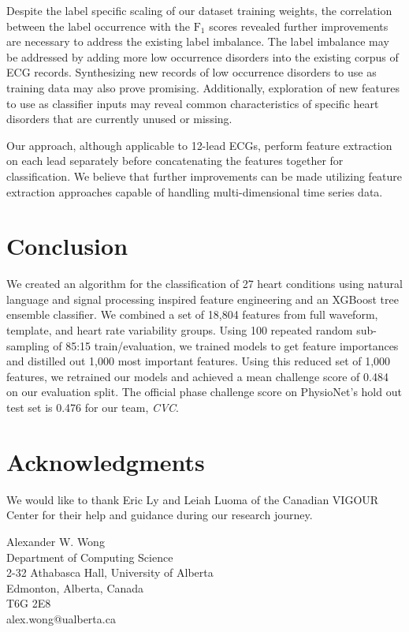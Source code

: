 \documentclass[twocolumn]{cinc}
\begin{document}
Despite the label specific scaling of our dataset training weights, the correlation between the label occurrence with the $\text{F}_1$ scores revealed further improvements are necessary to address the existing label imbalance.
The label imbalance may be addressed by adding more low occurrence disorders into the existing corpus of ECG records.
Synthesizing new records of low occurrence disorders to use as training data may also prove promising.
Additionally, exploration of new features to use as classifier inputs may reveal common characteristics of specific heart disorders that are currently unused or missing.

Our approach, although applicable to 12-lead ECGs, perform feature extraction on each lead separately before concatenating the features together for classification.
We believe that further improvements can be made utilizing feature extraction approaches capable of handling multi-dimensional time series data.

\section{Conclusion}

We created an algorithm for the classification of 27 heart conditions using natural language and signal processing inspired feature engineering and an XGBoost tree ensemble classifier.
We combined a set of 18,804 features from full waveform, template, and heart rate variability groups.
Using 100 repeated random sub-sampling of 85:15 train/evaluation, we trained models to get feature importances and distilled out 1,000 most important features.
Using this reduced set of 1,000 features, we retrained our models and achieved a mean challenge score of 0.484 on our evaluation split.
The official phase challenge score on PhysioNet's hold out test set is 0.476 for our team, \emph{CVC}.


\section*{Acknowledgments}
We would like to thank Eric Ly and Leiah Luoma of the Canadian VIGOUR Center for their help and guidance during our research journey.



\begin{correspondence}
Alexander W. Wong\\
Department of Computing Science\\
2-32 Athabasca Hall, University of Alberta\\
Edmonton, Alberta, Canada\\
T6G 2E8\\
alex.wong@ualberta.ca
\end{correspondence}
\end{document}
